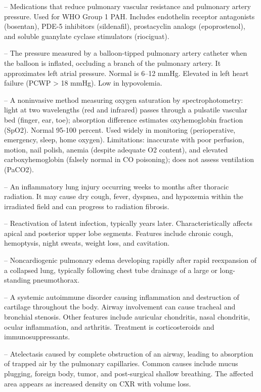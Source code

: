 -- Medications that reduce pulmonary vascular resistance and pulmonary artery pressure. Used for WHO Group 1 PAH. Includes endothelin receptor antagonists (bosentan), PDE-5 inhibitors (sildenafil), prostacyclin analogs (epoprostenol), and soluble guanylate cyclase stimulators (riociguat).

-- The pressure measured by a balloon-tipped pulmonary artery catheter when the balloon is inflated, occluding a branch of the pulmonary artery. It approximates left atrial pressure. Normal is 6--12 mmHg. Elevated in left heart failure (PCWP > 18 mmHg). Low in hypovolemia.

-- A noninvasive method measuring oxygen saturation by spectrophotometry: light at two wavelengths (red and infrared) passes through a pulsatile vascular bed (finger, ear, toe); absorption difference estimates oxyhemoglobin fraction (SpO2). Normal 95-100 percent. Used widely in monitoring (perioperative, emergency, sleep, home oxygen). Limitations: inaccurate with poor perfusion, motion, nail polish, anemia (despite adequate O2 content), and elevated carboxyhemoglobin (falsely normal in CO poisoning); does not assess ventilation (PaCO2).

-- An inflammatory lung injury occurring weeks to months after thoracic radiation. It may cause dry cough, fever, dyspnea, and hypoxemia within the irradiated field and can progress to radiation fibrosis.

-- Reactivation of latent infection, typically years later. Characteristically affects apical and posterior upper lobe segments. Features include chronic cough, hemoptysis, night sweats, weight loss, and cavitation.

-- Noncardiogenic pulmonary edema developing rapidly after rapid reexpansion of a collapsed lung, typically following chest tube drainage of a large or long-standing pneumothorax.

-- A systemic autoimmune disorder causing inflammation and destruction of cartilage throughout the body. Airway involvement can cause tracheal and bronchial stenosis. Other features include auricular chondritis, nasal chondritis, ocular inflammation, and arthritis. Treatment is corticosteroids and immunosuppressants.

-- Atelectasis caused by complete obstruction of an airway, leading to absorption of trapped air by the pulmonary capillaries. Common causes include mucus plugging, foreign body, tumor, and post-surgical shallow breathing. The affected area appears as increased density on CXR with volume loss.

